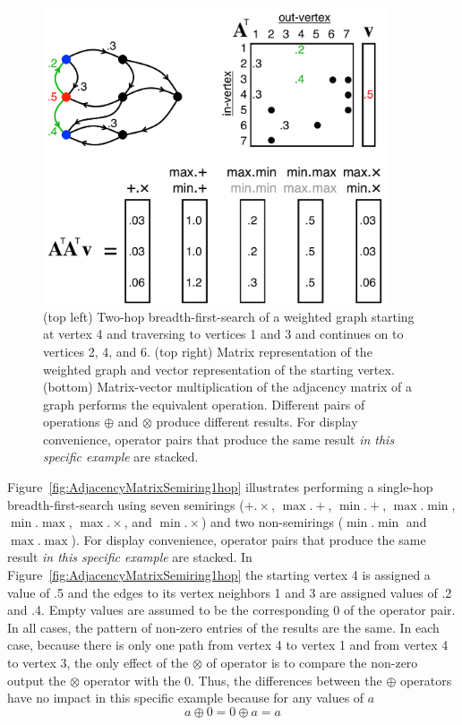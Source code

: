 \begin{figure}[!htb]
  \centering
    \includegraphics[width=4in]{figures/AdjacencyMatrixSemiring2hop.pdf}
      \caption{(top left) Two-hop breadth-first-search of a weighted graph starting at vertex 4 and traversing to vertices 1 and 3 and continues on to vertices 2, 4, and 6. (top right) Matrix representation of the weighted graph and vector representation of the starting vertex. (bottom) Matrix-vector multiplication of the adjacency matrix of a graph performs the equivalent operation.  Different pairs of operations $\oplus$ and $\otimes$ produce different results. For display convenience, operator pairs that produce the same result \emph{in this specific example} are stacked.}
      \label{fig:AdjacencyMatrixSemiring2hop}
\end{figure}

  Figure~\ref{fig:AdjacencyMatrixSemiring1hop} illustrates performing a single-hop breadth-first-search using seven semirings (${+}.{\times}$, ${\max}.{+}$, ${\min}.{+}$, ${\max}.{\min}$, ${\min}.{\max}$, ${\max}.{\times}$, and ${\min}.{\times}$) and two non-semirings (${\min}.{\min}$ and ${\max}.{\max}$).  For display convenience, operator pairs that produce the same result \emph{in this specific example} are stacked.  In Figure~\ref{fig:AdjacencyMatrixSemiring1hop} the starting vertex 4 is assigned a value of .5 and the edges to its vertex neighbors 1 and 3 are assigned values of .2 and .4.  Empty values are assumed to be the corresponding 0 of the operator pair. In all cases, the pattern of non-zero entries of the results are the same.  In each case, because there is only one path from vertex 4 to vertex 1 and from vertex 4 to vertex 3, the only effect of the $\otimes$ of operator is to compare the non-zero output the $\otimes$ operator with the 0.  Thus, the differences between the $\oplus$ operators have no impact in this specific example because for any values of $a$
$$
  a \oplus 0 = 0 \oplus a = a
$$

